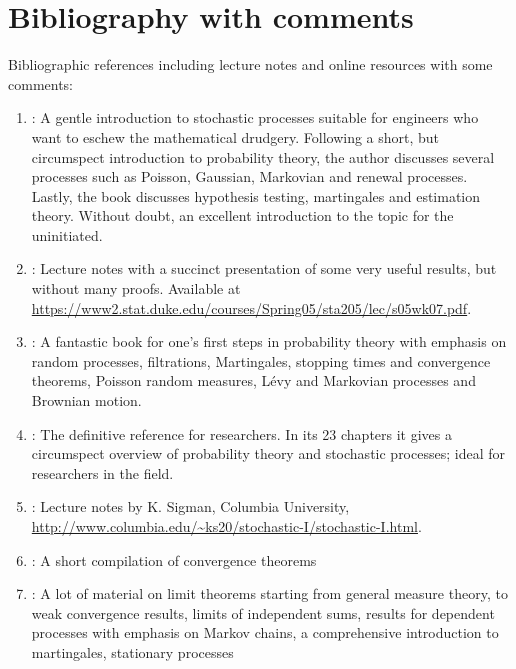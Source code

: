 \documentclass[a4paper,10pt]{article}
\let\oldbibentry\bibentry
\renewcommand{\bibentry}[1]{{\color{blue} \oldbibentry{#1}}}
\begin{document}
\section{Bibliography with comments}
%
Bibliographic references including lecture notes and online resources with some comments:
{\small
\begin{enumerate}
 \item \label{cite:Gallager2013} : A gentle introduction to stochastic 
        processes suitable for engineers who want to eschew the mathematical drudgery. 
        Following a short, but circumspect introduction to probability theory, the author 
        discusses several processes such as Poisson, Gaussian, Markovian and renewal processes. 
        Lastly, the book discusses hypothesis testing, martingales and estimation theory. 
        Without doubt, an excellent introduction to the topic for the uninitiated. 
 \item \label{cite:RLWolpert05} : Lecture notes with a succinct presentation 
	of some very useful results, but without many proofs. 
	Available at \url{https://www2.stat.duke.edu/courses/Spring05/sta205/lec/s05wk07.pdf}.
 \item \label{cite:cinlar2011} : A fantastic book for one's first 
       steps in probability theory with 
       emphasis on random processes, filtrations, Martingales, stopping times and convergence 
       theorems, Poisson random measures, L{\'{e}}vy and Markovian processes and Brownian motion.
 \item \label{cite:Kallnberg} : The definitive reference for researchers. In its 23 chapters
       it gives a circumspect overview of probability theory and stochastic processes; ideal for researchers in the field.
 \item \label{cite:KSigman2009}: Lecture notes by K. Sigman, Columbia University,
       \url{http://www.columbia.edu/~ks20/stochastic-I/stochastic-I.html}.
 \item \label{cite:DWalnut2011} : A short compilation of convergence theorems       
 \item \label{cite:Varadhan} : A lot of material on limit theorems 
       starting from general measure theory, to weak convergence results, limits 
       of independent sums, results for dependent processes 
       with emphasis on Markov chains, a comprehensive introduction to martingales, stationary processes

\end{enumerate}}
\end{document}

